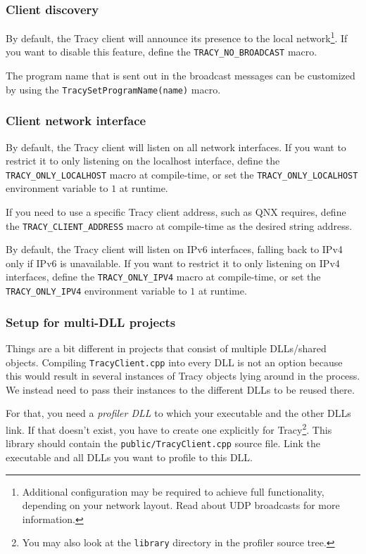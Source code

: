 \documentclass[hidelinks,titlepage,a4paper,twoside]{article}
\begin{document}
\subsubsection{Client discovery}

By default, the Tracy client will announce its presence to the local network\footnote{Additional configuration may be required to achieve full functionality, depending on your network layout. Read about UDP broadcasts for more information.}. If you want to disable this feature, define the \texttt{TRACY\_NO\_BROADCAST} macro.

The program name that is sent out in the broadcast messages can be customized by using the \texttt{TracySetProgramName(name)} macro.

\subsubsection{Client network interface}

By default, the Tracy client will listen on all network interfaces. If you want to restrict it to only listening on the localhost interface, define the \texttt{TRACY\_ONLY\_LOCALHOST} macro at compile-time, or set the \texttt{TRACY\_ONLY\_LOCALHOST} environment variable to $1$ at runtime.

If you need to use a specific Tracy client address, such as QNX requires, define the \texttt{TRACY\_CLIENT\_ADDRESS} macro at compile-time as the desired string address.

By default, the Tracy client will listen on IPv6 interfaces, falling back to IPv4 only if IPv6 is unavailable. If you want to restrict it to only listening on IPv4 interfaces, define the \texttt{TRACY\_ONLY\_IPV4} macro at compile-time, or set the \texttt{TRACY\_ONLY\_IPV4} environment variable to $1$ at runtime.

\subsubsection{Setup for multi-DLL projects}

Things are a bit different in projects that consist of multiple DLLs/shared objects. Compiling \texttt{TracyClient.cpp} into every DLL is not an option because this would result in several instances of Tracy objects lying around in the process. We instead need to pass their instances to the different DLLs to be reused there.

For that, you need a \emph{profiler DLL} to which your executable and the other DLLs link. If that doesn't exist, you have to create one explicitly for Tracy\footnote{You may also look at the \texttt{library} directory in the profiler source tree.}. This library should contain the \texttt{public/TracyClient.cpp} source file. Link the executable and all DLLs you want to profile to this DLL.
\end{document}
